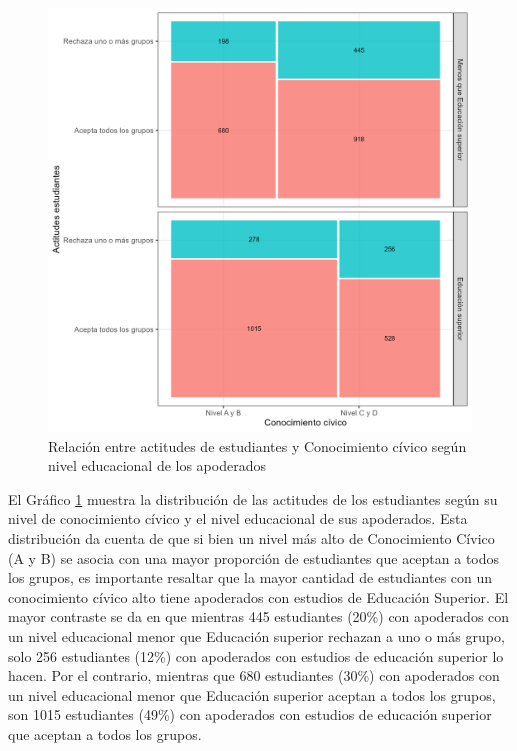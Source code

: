 \documentclass[12pt,twoside]{templates/facsothesis}
\begin{document}
\begin{figure}[!ht]

{\centering \includegraphics[width=1\linewidth,]{IPO/output/graphs/plot_bivariado} 

}

\caption{Relación entre actitudes de estudiantes y Conocimiento cívico según nivel educacional de los apoderados}\label{fig:graph-bivariado}
\end{figure}

El Gráfico \ref{fig:graph-bivariado} muestra la distribución de las actitudes de los estudiantes según su nivel de conocimiento cívico y el nivel educacional de sus apoderados. Esta distribución da cuenta de que si bien un nivel más alto de Conocimiento Cívico (A y B) se asocia con una mayor proporción de estudiantes que aceptan a todos los grupos, es importante resaltar que la mayor cantidad de estudiantes con un conocimiento cívico alto tiene apoderados con estudios de Educación Superior. El mayor contraste se da en que mientras 445 estudiantes (20\%) con apoderados con un nivel educacional menor que Educación superior rechazan a uno o más grupo, solo 256 estudiantes (12\%) con apoderados con estudios de educación superior lo hacen. Por el contrario, mientras que 680 estudiantes (30\%) con apoderados con un nivel educacional menor que Educación superior aceptan a todos los grupos, son 1015 estudiantes (49\%) con apoderados con estudios de educación superior que aceptan a todos los grupos.
\end{document}
